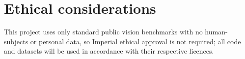 \documentclass[11pt,a4paper]{report}
\newcommand{\guide}[1]{%
  \par\smallskip
  \noindent{\color{gray!85!black}\small\itshape\textbf{[Writing guide]}~#1}%
  \par\smallskip
}
\begin{document}
\section{Ethical considerations}
This project uses only standard public vision benchmarks with no human-subjects or
personal data, so Imperial ethical approval is not required; all code and datasets
will be used in accordance with their respective licences.



\end{document}
